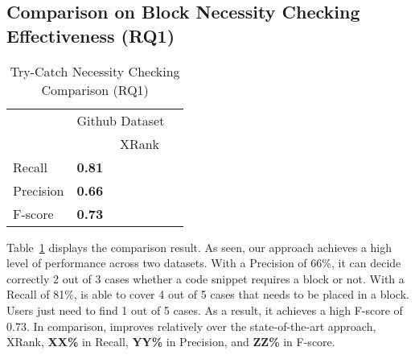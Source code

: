 \subsection{Comparison on  Block Necessity Checking Effectiveness (RQ1)}
\label{sec:rq1}

\begin{table}[htpb]
  \caption{Try-Catch Necessity Checking Comparison (RQ1)}
  \vspace{-12pt}
	\begin{center}
		\renewcommand{\arraystretch}{1}
		\begin{tabular}{|p{1.5cm}<{\centering}|p{1.25cm}<{\centering}|p{1.25cm}<{\centering}|p{1.25cm}<{\centering}}
		  \hline
			\multirow{2}{*}{} & \multicolumn{2}{c|}{Github Dataset} \\
			\cline{2-3}
			  & \tool  & XRank \\
			\hline
			Recall    & \textbf{0.81} & \\
			Precision & \textbf{0.66} & \\
			F-score   & \textbf{0.73} & \\
			\hline
		\end{tabular}
		\label{tab:xblock}
	\end{center}
\end{table}


Table~\ref{tab:xblock} displays the comparison result. As seen, our
approach achieves a high level of performance across two
datasets. With a Precision of 66\%, it can decide correctly 2 out of 3
cases whether a code snippet requires a  block or
not. With a Recall of 81\%, {\tool} is able to cover 4 out of 5 cases
that needs to be placed in a  block. Users just need
to find 1 out of 5 cases. As a result, it achieves a high F-score of
0.73.
In comparison, {\tool} improves relatively over the state-of-the-art
approach, XRank, {\bf XX\%} in Recall, {\bf YY\%} in Precision, and
{\bf ZZ\%} in F-score.


